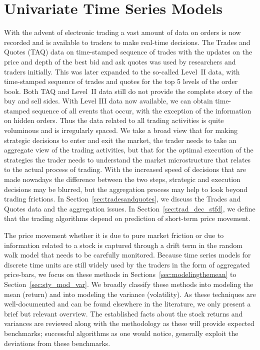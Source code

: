 \chapter{Univariate Time Series Models \label{ch:ch_uvts}}

With the advent of electronic trading a vast amount of data on orders is now recorded and is available to traders to make real-time decisions. The Trades and Quotes (TAQ) data on time-stamped sequence of trades with the updates on the price and depth of the best bid and ask quotes was used by researchers and traders initially. This was later expanded to the so-called Level~II data, with time-stamped sequence of trades and quotes for the top 5 levels of the order book. Both TAQ and Level~II data still do not provide the complete story of the buy and sell sides. With Level III data now available, we can obtain time-stamped sequence of all events that occur, with the exception of the information on hidden orders. Thus the data related to all trading activities is quite voluminous and is irregularly spaced. We take a broad view that for making strategic decisions to enter and exit the market, the trader needs to take an aggregate view of the trading activities, but that for the optimal execution of the strategies the trader needs to understand the market microstructure that relates to the actual process of trading. With the increased speed of decisions that are made nowadays the difference between the two steps, strategic and execution decisions may be blurred, but the aggregation process may help to look beyond trading frictions. In Section~\ref{sec:tradesandquotes}, we discuss the Trades and Quotes data and the aggregation issues. In Section~\ref{sec:trad_dec_stfd}, we define that the trading algorithms depend on prediction of short-term price movement.


The price movement whether it is due to pure market friction or due to information related to a stock is captured through a drift term in the random walk model that needs to be carefully monitored. Because time series models for discrete time units are still widely used by the traders in the form of aggregated price-bars, we focus on these methods in Sections~\ref{sec:modelingthemean} to Section~\ref{sec:sty_mod_var}. We broadly classify these methods into modeling the mean (return) and into modeling the variance (volatility). As these techniques are well-documented and can be found elsewhere in the literature, we only present a brief but relevant overview. The established facts about the stock returns and variances are reviewed along with the methodology as these will provide expected benchmarks; successful algorithms as one would notice, generally exploit the deviations from these benchmarks.



